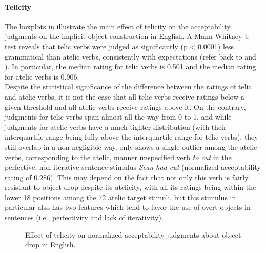 \paragraph{Telicity}
The boxplots in  illustrate the main effect of telicity on the acceptability judgments on the implicit object construction in English. A Mann-Whitney U test reveals that telic verbs were judged as significantly (p < 0.0001) less grammatical than atelic verbs, consistently with expectations (refer back to  and ). In particular, the median rating for telic verbs is 0.501 and the median rating for atelic verbs is 0.906.\\
Despite the statistical significance of the difference between the ratings of telic and atelic verbs, it is not the case that all telic verbs receive ratings below a given threshold and all atelic verbs receive ratings above it. On the contrary, judgments for telic verbs span almost all the way from 0 to 1, and while judgments for atelic verbs have a much tighter distribution (with their interquartile range being fully above the interquartile range for telic verbs), they still overlap in a non-negligible way.
 only shows a single outlier among the atelic verbs, corresponding to the atelic, manner unspecified verb \textit{to cut} in the perfective, non-iterative sentence stimulus \textit{Sean had cut} (normalized acceptability rating of 0.286). This may depend on the fact that not only this verb is fairly resistant to object drop despite its atelicity, with all its ratings being within the lower 18 positions among the 72 atelic target stimuli, but this stimulus in particular also has two features which tend to favor the use of overt objects in sentences (i.e., perfectivity and lack of iterativity).

\begin{figure}[htb]
\caption{Effect of telicity on normalized acceptability judgments about object drop in English.}
    
\end{figure}


